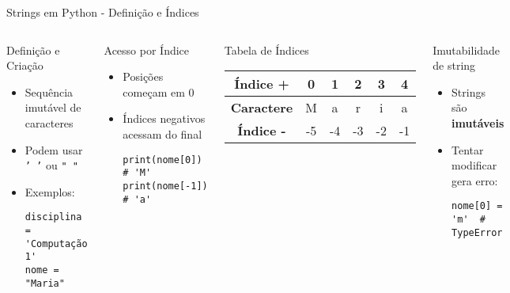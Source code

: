 \begin{frame}[fragile]{Strings em Python - Definição e Índices}

    \begin{columns}[T]
        \begin{block}{Definição e Criação}
            \begin{itemize}
                \item Sequência imutável de caracteres
                \item Podem usar \texttt{' '} ou \texttt{" "}
                \item Exemplos:
                      \begin{verbatim}
disciplina = 'Computação 1'
nome = "Maria"
\end{verbatim}
            \end{itemize}
        \end{block}

        \begin{block}{Acesso por Índice}
            \begin{itemize}
                \item Posições começam em 0
                \item Índices negativos acessam do final
                      \begin{verbatim}
print(nome[0])   # 'M'
print(nome[-1])  # 'a'
\end{verbatim}
            \end{itemize}
        \end{block}

        \begin{exampleblock}{Tabela de Índices}
            \centering
            \begin{tabular}{|c|c|c|c|c|c|}
                \hline
                \textbf{Índice +}  & 0  & 1  & 2  & 3  & 4  \\
                \hline
                \textbf{Caractere} & M  & a  & r  & i  & a  \\
                \hline
                \textbf{Índice -}  & -5 & -4 & -3 & -2 & -1 \\
                \hline
            \end{tabular}
        \end{exampleblock}

        \begin{block}{Imutabilidade de string}
            \begin{itemize}
                \item Strings são \textbf{imutáveis}
                \item Tentar modificar gera erro:
                      \begin{verbatim}
nome[0] = 'm'  # TypeError
\end{verbatim}
            \end{itemize}
        \end{block}
    \end{columns}

\end{frame}


